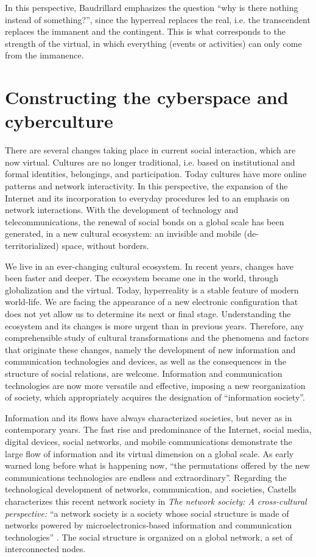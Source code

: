 \documentclass[english]{textolivre}
\begin{document}
In this perspective, Baudrillard emphasizes the question “why is there nothing instead of something?”, since the hyperreal replaces the real, i.e. the transcendent replaces the immanent and the contingent. This is what corresponds to the strength of the virtual, in which everything (events or activities) can only come from the immanence.

\section{Constructing the cyberspace and cyberculture}

There are several changes taking place in current social interaction, which are now virtual. Cultures are no longer traditional, i.e. based on institutional and formal identities, belongings, and participation. Today cultures have more online patterns and network interactivity. In this perspective, the expansion of the Internet and its incorporation to everyday procedures led to an emphasis on network interactions. With the development of technology and telecommunications, the renewal of social bonds on a global scale has been generated, in a new cultural ecosystem: an invisible and mobile (de-territorialized) space, without borders.

We live in an ever-changing cultural ecosystem. In recent years, changes have been faster and deeper. The ecosystem became one in the world, through globalization and the virtual. Today, hyperreality is a stable feature of modern world-life. We are facing the appearance of a new electronic configuration that does not yet allow us to determine its next or final stage. Understanding the ecosystem and its changes is more urgent than in previous years. Therefore, any comprehensible study of cultural transformations and the phenomena and factors that originate these changes, namely the development of new information and communication technologies and devices, as well as the consequences in the structure of social relations, are welcome. Information and communication technologies are now more versatile and effective, imposing a new reorganization of society, which appropriately acquires the designation of “information society”.

Information and its flows have always characterized societies, but never as in contemporary years. The fast rise and predominance of the Internet, social media, digital devices, social networks, and mobile communications demonstrate the large flow of information and its virtual dimension on a global scale. As \textcite[p.~426]{toffler_third_1981} early warned long before what is happening now, “the permutations offered by the new communications technologies are endless and extraordinary”. Regarding the technological development of networks, communication, and societies, Castells characterizes this recent network society in \textit{The network society: A cross-cultural perspective:} “a network society is a society whose social structure is made of networks powered by microelectronics-based information and communication technologies” \cite[p.~3]{castells_network_2004}. The social structure is organized on a global network, a set of interconnected nodes.
\end{document}
